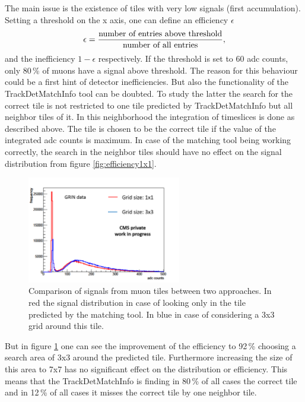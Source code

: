 			The main issue is the existence of tiles with very low signals (first accumulation).
			Setting a threshold on the x axis, one can define an efficiency $\epsilon$
			\begin{equation}
				\epsilon = \frac{\textnormal{number of entries above threshold}}{\textnormal{number of all entries}},
			\end{equation}
			and the inefficiency $1-\epsilon$ respectively.
			If the threshold is set to 60 adc counts, only 80\,\% of muons have a signal above threshold.
			The reason for this behaviour could be a first hint of detector inefficiencies.
			But also the functionality of the TrackDetMatchInfo tool can be doubted.
			To study the latter the search for the correct tile is not restricted to one tile predicted by TrackDetMatchInfo but all neighbor tiles of it.
			In this neighborhood the integration of timeslices is done as described above.
			The tile is chosen to be the correct tile if the value of the integrated adc counts is maximum.
			In case of the matching tool being working correctly, the search in the neighbor tiles should have no effect on the signal distribution from figure \ref{fig:efficiency1x1}.
			\begin{figure}[htbp]
				\centering
				\includegraphics[width=0.60\textwidth]{Figures/erdogan/neighborhood.png}
				\caption{Comparison of signals from muon tiles between two approaches. In red the signal distribution in case of looking only in the tile predicted by the matching tool. In blue in case of
				considering a 3x3 grid around this tile.}
				\label{fig:neighborhood}
			\end{figure}
			But in figure \ref{fig:neighborhood} one can see the improvement of the efficiency to 92\,\% choosing a search area of 3x3 around the predicted tile.
			Furthermore increasing the size of this area to 7x7 has no significant effect on the distribution or efficiency.
			This means that the TrackDetMatchInfo is finding in 80\,\% of all cases the correct tile and in 12\,\% of all cases it misses the correct tile by one neighbor tile.
